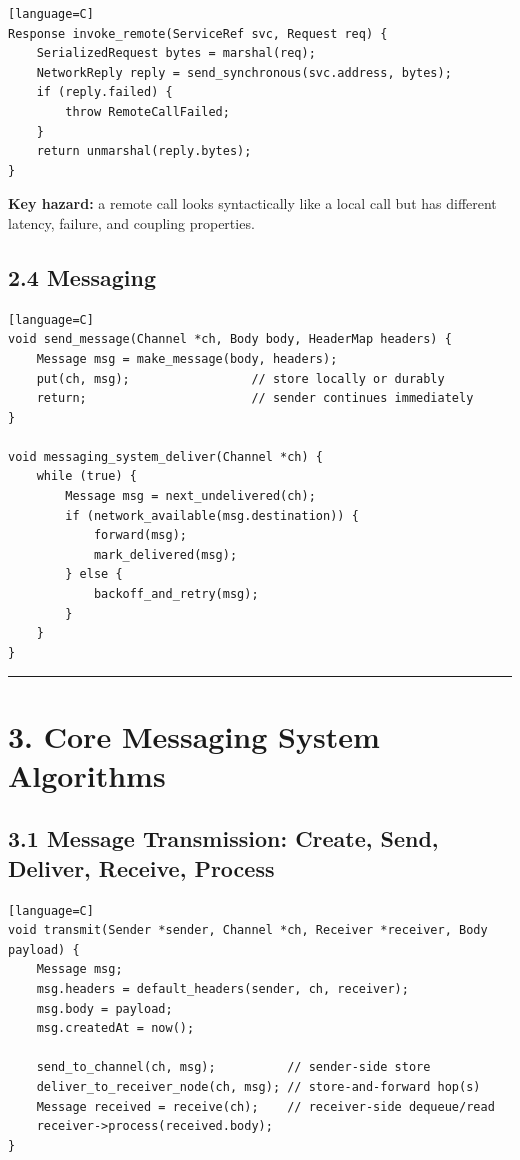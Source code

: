 \documentclass[11pt]{article}
\begin{document}
\begin{verbatim}[language=C]
Response invoke_remote(ServiceRef svc, Request req) {
    SerializedRequest bytes = marshal(req);
    NetworkReply reply = send_synchronous(svc.address, bytes);
    if (reply.failed) {
        throw RemoteCallFailed;
    }
    return unmarshal(reply.bytes);
}
\end{verbatim}

\textbf{Key hazard:} a remote call looks syntactically like a local call
but has different latency, failure, and coupling properties.

\subsection{2.4 Messaging}\label{messaging}

\begin{verbatim}[language=C]
void send_message(Channel *ch, Body body, HeaderMap headers) {
    Message msg = make_message(body, headers);
    put(ch, msg);                 // store locally or durably
    return;                       // sender continues immediately
}

void messaging_system_deliver(Channel *ch) {
    while (true) {
        Message msg = next_undelivered(ch);
        if (network_available(msg.destination)) {
            forward(msg);
            mark_delivered(msg);
        } else {
            backoff_and_retry(msg);
        }
    }
}
\end{verbatim}

\begin{center}\rule{0.5\linewidth}{0.5pt}\end{center}

\section{3. Core Messaging System
Algorithms}\label{core-messaging-system-algorithms}

\subsection{3.1 Message Transmission: Create, Send, Deliver, Receive,
Process}\label{message-transmission-create-send-deliver-receive-process}

\begin{verbatim}[language=C]
void transmit(Sender *sender, Channel *ch, Receiver *receiver, Body payload) {
    Message msg;
    msg.headers = default_headers(sender, ch, receiver);
    msg.body = payload;
    msg.createdAt = now();

    send_to_channel(ch, msg);          // sender-side store
    deliver_to_receiver_node(ch, msg); // store-and-forward hop(s)
    Message received = receive(ch);    // receiver-side dequeue/read
    receiver->process(received.body);
}
\end{verbatim}
\end{document}
